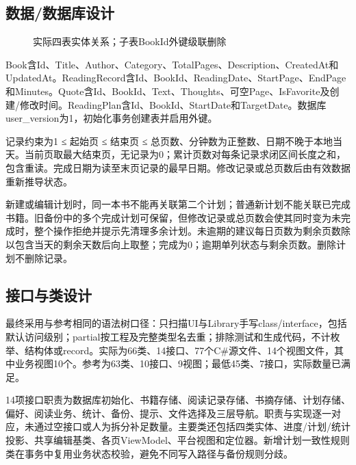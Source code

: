 \documentclass[UTF8,a4paper,11pt,fontset=none]{ctexart}
\begin{document}
\subsection{数据/数据库设计}
\begin{figure}[H]\centering
{}\caption{实际四表实体关系；子表BookId外键级联删除}\end{figure}

Book含Id、Title、Author、Category、TotalPages、Description、CreatedAt和UpdatedAt。ReadingRecord含Id、BookId、ReadingDate、StartPage、EndPage和Minutes。Quote含Id、BookId、Text、Thoughts、可空Page、IsFavorite及创建/修改时间。ReadingPlan含Id、BookId、StartDate和TargetDate。数据库user\_version为1，初始化事务创建表并启用外键。

记录约束为1 ≤ 起始页 ≤ 结束页 ≤ 总页数、分钟数为正整数、日期不晚于本地当天。当前页取最大结束页，无记录为0；累计页数对每条记录求闭区间长度之和，包含重读。完成日期为读至末页记录的最早日期。修改记录或总页数后由有效数据重新推导状态。

新建或编辑计划时，同一本书不能再关联第二个计划；普通新计划不能关联已完成书籍。旧备份中的多个完成计划可保留，但修改记录或总页数会使其同时变为未完成时，整个操作拒绝并提示先清理多余计划。未逾期的建议每日页数为剩余页数除以包含当天的剩余天数后向上取整；完成为0；逾期单列状态与剩余页数。删除计划不删除记录。
\subsection{接口与类设计}
最终采用与参考相同的语法树口径：只扫描UI与Library手写class/interface，包括默认访问级别；partial按工程及完整类型名去重；排除测试和生成代码，不计枚举、结构体或record。实际为66类、14接口、77个C\#源文件、14个视图文件，其中业务视图10个。参考为63类、10接口、9视图；最低45类、7接口，实际数量已满足。

14项接口职责为数据库初始化、书籍存储、阅读记录存储、书摘存储、计划存储、偏好、阅读业务、统计、备份、提示、文件选择及三层导航。职责与实现逐一对应，未通过空接口或人为拆分补足数量。主要类还包括四类实体、进度/计划/统计投影、共享编辑基类、各页ViewModel、平台视图和定位器。新增计划一致性规则类在事务中复用业务状态校验，避免不同写入路径与备份规则分歧。
\end{document}
